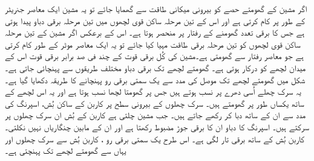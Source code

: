 اگر مشین کے گھومتے حصے کو بیرونی میکانی طاقت سے گھمایا جائے تو یہ مشین ایک معاصر جنریٹر کے طور پر کام کرتی ہے اور اس کے تین مرحلہ ساکن قوی لچھوں میں تین مرحلہ برقی دباو پیدا ہوتی ہے جس کا برقی تعدد گھومنے کے رفتار پر منحصر ہوتا ہے۔ اس کے برعکس اگر مشین کے تین  مرحلہ ساکن قوی لچھوں کو تین مرحلہ برقی طاقت مہیا کیا جائے تو یہ ایک معاصر موٹر کے طور کام کرتی ہے جو معاصر رفتار سے گھومتی ہے۔مشین کی کُل برقی قوت کے چند فی صد  برابر برقی قوت اس کے میدان لچھے کو درکار ہوتی ہے۔ گھومتے لچھے تک برقی دباو مختلف طریقوں سے پہنچائی جاتی ہے۔شکل   میں گھومتے لچھے تک موصل   کی مدد سے یک سمتی برقی رو پہنچانے کا طریقہ دکھایا گیا ہے۔ یہ سرک چھلے اُسی دھرے  پر نسب ہوتے ہیں جس پر گھومتا لچھا نسب ہوتا ہے اور یہ اس لچھے کے ساتھ یکساں طور پر گھومتے ہیں۔ سرک چھلوں  کے بیرونی سطح پر کاربن کے ساکن بُش، اسپرنگ  کی مدد سے ان کے ساتھ دبا کر رکھے جاتے ہیں۔ جب مشین چلتی ہے  کاربن کے بُش ان سرک چھلوں پر سرکتے ہیں۔ اسپرنگ کا دباو ان کا برقی جوڑ مضبوط رکھتا ہے اور ان کے مابین چنگاریاں نہیں نکلتی۔ کاربن بُش کے ساتھ برقی تار لگی ہے۔ اس طرح یک سمتی برقی رو  ، کاربن بُش سے سرک چھلوں اور یہاں سے گھومتے لچھے تک پہنچتی ہے۔

